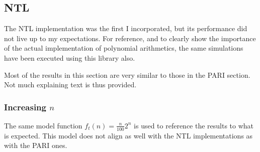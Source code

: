 \documentclass[a4paper]{article}
\begin{document}
\subsection{NTL}
The NTL implementation was the first I incorporated, but its performance did not live up to my expectations. For reference, and to clearly show the importance of the actual implementation of polynomial arithmetics, the same simulations have been executed using this library also.

Most of the results in this section are very similar to those in the PARI section. Not much explaining text is thus provided.

\subsubsection{Increasing $n$}
The same model function $f_t(n) = \frac{n}{100}2^n$ is used to reference the results to what is expected. This model does not align as well with the NTL implementations as with the PARI ones.
\end{document}
